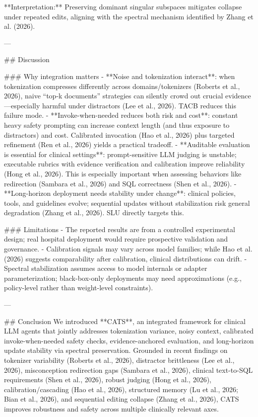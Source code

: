 **Interpretation:** Preserving dominant singular subspaces mitigates collapse under repeated edits, aligning with the spectral mechanism identified by Zhang et al. (2026).

---

## Discussion  

### Why integration matters  
- **Noise and tokenization interact**: when tokenization compresses differently across domains/tokenizers (Roberts et al., 2026), naive “top-k documents” strategies can silently crowd out crucial evidence—especially harmful under distractors (Lee et al., 2026). TACB reduces this failure mode.  
- **Invoke-when-needed reduces both risk and cost**: constant heavy safety prompting can increase context length (and thus exposure to distractors) and cost. Calibrated invocation (Hao et al., 2026) plus targeted refinement (Ren et al., 2026) yields a practical tradeoff.  
- **Auditable evaluation is essential for clinical settings**: prompt-sensitive LLM judging is unstable; executable rubrics with evidence verification and calibration improve reliability (Hong et al., 2026). This is especially important when assessing behaviors like redirection (Sambara et al., 2026) and SQL correctness (Shen et al., 2026).  
- **Long-horizon deployment needs stability under change**: clinical policies, tools, and guidelines evolve; sequential updates without stabilization risk general degradation (Zhang et al., 2026). SLU directly targets this.

### Limitations  
- The reported results are from a controlled experimental design; real hospital deployment would require prospective validation and governance.  
- Calibration signals may vary across model families; while Hao et al. (2026) suggests comparability after calibration, clinical distributions can drift.  
- Spectral stabilization assumes access to model internals or adapter parameterization; black-box-only deployments may need approximations (e.g., policy-level rather than weight-level constraints).

---

## Conclusion  
We introduced **CATS**, an integrated framework for clinical LLM agents that jointly addresses tokenization variance, noisy context, calibrated invoke-when-needed safety checks, evidence-anchored evaluation, and long-horizon update stability via spectral preservation. Grounded in recent findings on tokenizer variability (Roberts et al., 2026), distractor brittleness (Lee et al., 2026), misconception redirection gaps (Sambara et al., 2026), clinical text-to-SQL requirements (Shen et al., 2026), robust judging (Hong et al., 2026), calibration/cascading (Hao et al., 2026), structured memory (Lu et al., 2026; Bian et al., 2026), and sequential editing collapse (Zhang et al., 2026), CATS improves robustness and safety across multiple clinically relevant axes.

